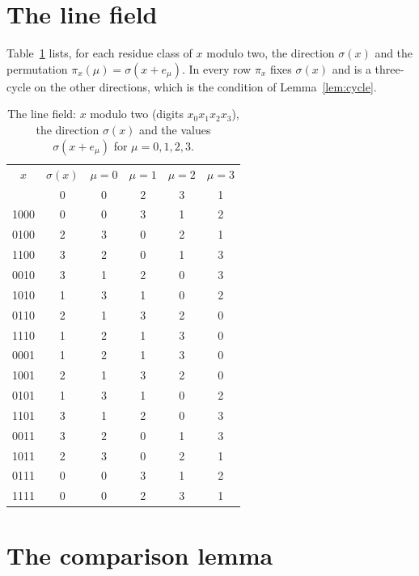 \documentclass[aps,prd,twocolumn,superscriptaddress,nofootinbib,longbibliography,floatfix,amsmath,amssymb,10pt]{revtex4-2}
\theoremstyle{definition}
\theoremstyle{remark}
\begin{document}
\appendix

\section{The line field}\label{app:table}

Table~\ref{tab:sigma} lists, for each residue class of $x$ modulo two, the
direction $\sigma(x)$ and the permutation $\pi_x(\mu)=\sigma(x+e_\mu)$. In every
row $\pi_x$ fixes $\sigma(x)$ and is a three-cycle on the other directions,
which is the condition of Lemma~\ref{lem:cycle}.

\begin{table}[h]
\caption{The line field: $x$ modulo two (digits $x_0x_1x_2x_3$), the
direction $\sigma(x)$ and the values $\sigma(x+e_\mu)$ for $\mu=0,1,2,3$.}
\label{tab:sigma}
\begin{ruledtabular}
\begin{tabular}{cccccc}
$x$&$\sigma(x)$&$\mu=0$&$\mu=1$&$\mu=2$&$\mu=3$\\
\colrule
0000 & 0 & 0 & 2 & 3 & 1 \\
1000 & 0 & 0 & 3 & 1 & 2 \\
0100 & 2 & 3 & 0 & 2 & 1 \\
1100 & 3 & 2 & 0 & 1 & 3 \\
0010 & 3 & 1 & 2 & 0 & 3 \\
1010 & 1 & 3 & 1 & 0 & 2 \\
0110 & 2 & 1 & 3 & 2 & 0 \\
1110 & 1 & 2 & 1 & 3 & 0 \\
0001 & 1 & 2 & 1 & 3 & 0 \\
1001 & 2 & 1 & 3 & 2 & 0 \\
0101 & 1 & 3 & 1 & 0 & 2 \\
1101 & 3 & 1 & 2 & 0 & 3 \\
0011 & 3 & 2 & 0 & 1 & 3 \\
1011 & 2 & 3 & 0 & 2 & 1 \\
0111 & 0 & 0 & 3 & 1 & 2 \\
1111 & 0 & 0 & 2 & 3 & 1 \\
\end{tabular}
\end{ruledtabular}
\end{table}

\section{The comparison lemma}\label{app:comparison}
\end{document}
